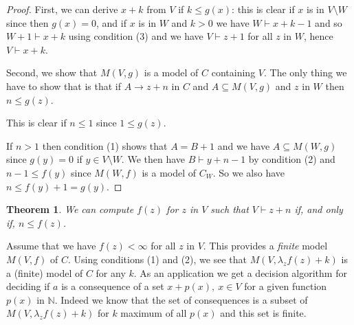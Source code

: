 \documentclass[11pt,a4paper]{article}
\newtheorem{theorem}{Theorem}[section]
\newcommand{\nats}{\mathbb{N}}
\begin{document}
\begin{proof}
  First, we can derive $x+k$ from $V$ if $k\leqslant g(x)$: this is clear if $x$ is in $V\setminus W$
  since then $g(x) = 0$, and if $x$ is in $W$ and $k>0$ we have $W\vdash x+k-1$ and so $W+1\vdash x+k$
  using condition (3) and we have $V\vdash z+1$ for all $z$ in $W$, hence $V\vdash x+k$.

  Second,  we show that $M(V,g)$ is a model of $C$ containing $V$. The only thing we have to show that is that
  if $A\rightarrow z+n$ in $C$ and $A\subseteq M(V,g)$ and $z$ in $W$ then $n\leqslant g(z)$.

  This is clear if $n\leqslant 1$ since $1\leqslant g(z)$.

  If $n>1$ then condition (1) shows that $A = B+1$ and we have
  $A\subseteq M(W,g)$ since $g(y) = 0$ if $y\in V\setminus W$. We then have $B\vdash y+n-1$
  by condition (2) and $n-1\leqslant f(y)$ since $M(W,f)$ is a model of $C_W$.
  So we also have $n\leqslant f(y)+1 = g(y)$.
\end{proof}

\begin{theorem}
We can compute $f(z)$ for $z$ in $V$ such that $V\vdash z+n$ if, and only if, $n\leqslant f(z)$.
\end{theorem}  


Assume that we have $f(z)<\infty$ for all $z$ in $V$. This provides a {\em finite} model $M(V,f)$
of $C$. Using conditions (1) and (2), we see that $M(V, \lambda_z f(z) +k)$ is a (finite) model of $C$
for any $k$. As an application we get a decision algorithm for deciding if $a$ is a consequence
of a set $x+p(x),~x\in V$ for a given function $p(x)$ in $\nats$. Indeed we know that the set of
consequences is a subset of $M(V, \lambda_z f(z)+k)$ for $k$ maximum of all $p(x)$ and this set
is finite.
\end{document}
